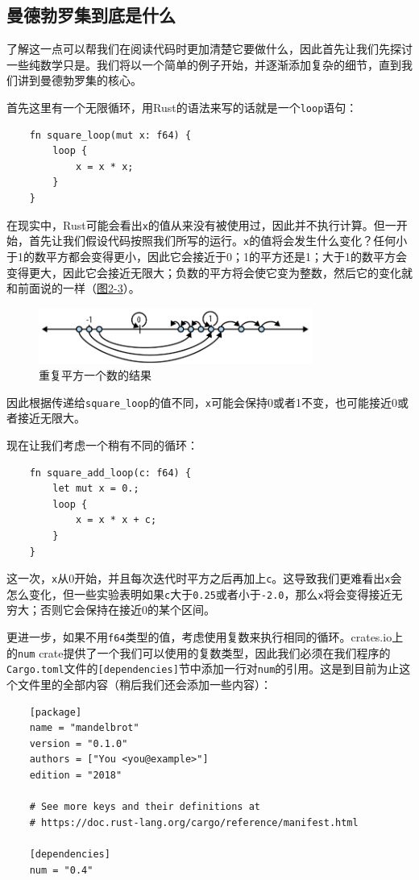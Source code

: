 \subsection{曼德勃罗集到底是什么}
了解这一点可以帮我们在阅读代码时更加清楚它要做什么，因此首先让我们先探讨一些纯数学只是。我们将以一个简单的例子开始，并逐渐添加复杂的细节，直到我们讲到曼德勃罗集的核心。

首先这里有一个无限循环，用Rust的语法来写的话就是一个\texttt{loop}语句：
\begin{verbatim}
    fn square_loop(mut x: f64) {
        loop {
            x = x * x;
        }
    }
\end{verbatim}

在现实中，Rust可能会看出\texttt{x}的值从来没有被使用过，因此并不执行计算。但一开始，首先让我们假设代码按照我们所写的运行。\texttt{x}的值将会发生什么变化？任何小于1的数平方都会变得更小，因此它会接近于0；1的平方还是1；大于1的数平方会变得更大，因此它会接近无限大；负数的平方将会使它变为整数，然后它的变化就和前面说的一样（\hyperref[f2-3]{图2-3}）。
\begin{figure}[htbp]
    \centering
    \includegraphics[width=0.8\textwidth]{../img/f2-3.png}
    \caption{重复平方一个数的结果}
    \label{f2-3}
\end{figure}

因此根据传递给\texttt{square\_loop}的值不同，\texttt{x}可能会保持0或者1不变，也可能接近0或者接近无限大。

现在让我们考虑一个稍有不同的循环：
\begin{verbatim}
    fn square_add_loop(c: f64) {
        let mut x = 0.;
        loop {
            x = x * x + c;
        }
    }
\end{verbatim}

这一次，\texttt{x}从0开始，并且每次迭代时平方之后再加上\texttt{c}。这导致我们更难看出\texttt{x}会怎么变化，但一些实验表明如果\texttt{c}大于\texttt{0.25}或者小于\texttt{-2.0}，那么\texttt{x}将会变得接近无穷大；否则它会保持在接近0的某个区间。

更进一步，如果不用\texttt{f64}类型的值，考虑使用复数来执行相同的循环。crates.io上的\texttt{num} crate提供了一个我们可以使用的复数类型，因此我们必须在我们程序的\texttt{Cargo.toml}文件的\texttt{[dependencies]}节中添加一行对\texttt{num}的引用。这是到目前为止这个文件里的全部内容（稍后我们还会添加一些内容）：
\begin{verbatim}
    [package]
    name = "mandelbrot"
    version = "0.1.0"
    authors = ["You <you@example>"]
    edition = "2018"

    # See more keys and their definitions at
    # https://doc.rust-lang.org/cargo/reference/manifest.html

    [dependencies]
    num = "0.4"
\end{verbatim}

